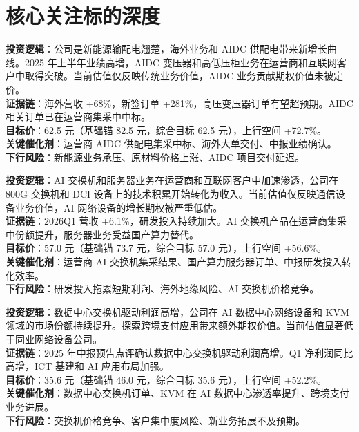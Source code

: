 \section{核心关注标的深度}

\begin{exhibitbox}
\textbf{投资逻辑}：公司是新能源输配电翘楚，海外业务和 AIDC 供配电带来新增长曲线。2025 年上半年业绩高增，AIDC 变压器和高低压柜业务在运营商和互联网客户中取得突破。当前估值仅反映传统业务价值，AIDC 业务贡献期权价值未被定价。\\
\textbf{证据链}：海外营收 +68\%，新签订单 +281\%，高压变压器订单有望超预期。AIDC 相关订单已在运营商集采中中标。\\
\textbf{目标价}：62.5 元（基础锚 82.5 元，综合目标 62.5 元），上行空间 +72.7\%。\\
\textbf{关键催化剂}：运营商 AIDC 供配电集采中标、海外大单交付、中报业绩确认。\\
\textbf{下行风险}：新能源业务承压、原材料价格上涨、AIDC 项目交付延迟。
\end{exhibitbox}

\begin{exhibitbox}
\textbf{投资逻辑}：AI 交换机和服务器业务在运营商和互联网客户中加速渗透，公司在 800G 交换机和 DCI 设备上的技术积累开始转化为收入。当前估值仅反映通信设备业务价值，AI 网络设备的增长期权被严重低估。\\
\textbf{证据链}：2026Q1 营收 +6.1\%，研发投入持续加大。AI 交换机产品在运营商集采中份额提升，服务器业务受益国产算力替代。\\
\textbf{目标价}：57.0 元（基础锚 73.7 元，综合目标 57.0 元），上行空间 +56.6\%。\\
\textbf{关键催化剂}：运营商 AI 交换机集采结果、国产算力服务器订单、中报研发投入转化效率。\\
\textbf{下行风险}：研发投入拖累短期利润、海外地缘风险、AI 交换机价格竞争。
\end{exhibitbox}

\begin{exhibitbox}
\textbf{投资逻辑}：数据中心交换机驱动利润高增，公司在 AI 数据中心网络设备和 KVM 领域的市场份额持续提升。探索跨境支付应用带来额外期权价值。当前估值显著低于同业网络设备公司。\\
\textbf{证据链}：2025 年中报预告点评确认数据中心交换机驱动利润高增。Q1 净利润同比高增，ICT 基建和 AI 应用布局加强。\\
\textbf{目标价}：35.6 元（基础锚 46.0 元，综合目标 35.6 元），上行空间 +52.2\%。\\
\textbf{关键催化剂}：数据中心交换机订单、KVM 在 AI 数据中心渗透率提升、跨境支付业务进展。\\
\textbf{下行风险}：交换机价格竞争、客户集中度风险、新业务拓展不及预期。
\end{exhibitbox}

